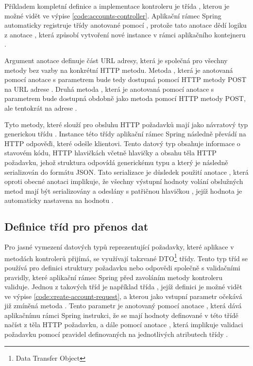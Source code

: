 Příkladem kompletní definice a implementace kontroleru je třída , kterou je možné vidět ve výpise \ref{code:accounts-controller}. Aplikační rámec Spring automaticky registruje třídy anotované pomocí , protože tato anotace dědí logiku z anotace , která způsobí vytvoření nové instance v rámci aplikačního kontejneru \cite[kap. 11.1.2]{walls_spring_2019}.

Argument anotace  definuje část URL adresy, která je společná pro všechny metody bez vazby na konkrétní HTTP metodu. Metoda , která je anotovaná pomocí anotace  s parametrem  bude tedy dostupná pomocí HTTP metody POST na URL adrese . Druhá metoda , která je anotovaná pomocí anotace  s parametrem  bude dostupná obdobně jako metoda  pomocí HTTP metody POST, ale tentokrát na adrese .

Tyto metody, které slouží pro obsluhu HTTP požadavků mají jako návratový typ generickou třídu . Instance této třídy aplikační rámec Spring následně převádí na HTTP odpověďi, které odešle klientovi. Tento datový typ obsahuje informace o stavovém kódu, HTTP hlavičkách včetně hlavičky  a obsahu těla HTTP požadavku, jehož struktura odpovídá generickému typu  a který je následně serializován do formátu JSON. Tato serializace je důsledek použití anotace , která oproti obecné anotaci  implikuje, že všechny výstupní hodnoty volání obslužných metod mají být serializovány a odeslány s patřičnou hlavičkou , jejíž hodnota je automaticky nastavena na hodnotu .

\subsection{Definice tříd pro přenos dat}

Pro jasné vymezení datových typů reprezentující požadavky, které aplikace v metodách kontrolerů přijímá, se využívají takzvané DTO\footnote{Data Transfer Object} třídy. Tento typ tříd se používá pro definici struktury požadavku nebo odpovědi společně s validačními pravidly, které aplikační rámec Spring před zavoláním metody kontroleru validuje. Jednou z takových tříd je například třída , jejíž definici je možné vidět ve výpise \ref{code:create-account-request}, a kterou jako vstupní parametr očekává již zmíněná metoda . Tento parametr je anotovaný pomocí anotace , která dává aplikačnímu rámci Spring instrukci, že se mají hodnoty definované v této třídě načíst z těla HTTP požadavku, a dále pomocí anotace , která implikuje validaci požadavku pomocí pravidel definovaných na jednotlivých atributech třídy .

